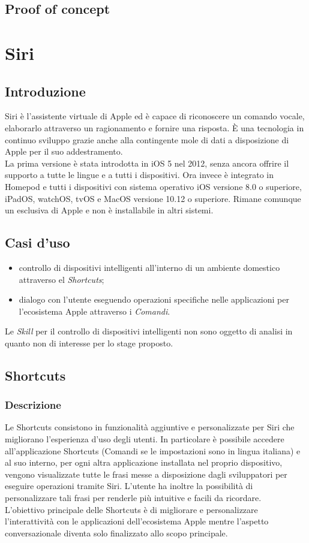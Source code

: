 	\subsection{Proof of concept}

\section{Siri}
	\subsection{Introduzione}
	Siri è l'assistente virtuale di Apple ed è capace di riconoscere un comando vocale, elaborarlo attraverso un ragionamento e fornire una risposta. È una tecnologia in continuo sviluppo grazie anche alla contingente mole di dati a disposizione di Apple per il suo addestramento. \\
	La prima versione è stata introdotta in iOS 5 nel 2012, senza ancora offrire il supporto a tutte le lingue e a tutti i dispositivi. Ora invece è integrato in Homepod e tutti i dispositivi con sistema operativo iOS versione 8.0 o superiore, iPadOS, watchOS, tvOS e MacOS versione 10.12 o superiore. Rimane comunque un esclusiva di Apple e non è installabile in altri sistemi.
	\subsection{Casi d'uso}
	\begin{itemize}
		\item controllo di dispositivi intelligenti all'interno di un ambiente domestico attraverso el \textit{Shortcuts};
		\item dialogo con l'utente eseguendo operazioni specifiche nelle applicazioni per l'ecosistema Apple attraverso i \textit{Comandi}.
	\end{itemize}
	Le \textit{Skill} per il controllo di dispositivi intelligenti non sono oggetto di analisi in quanto non di interesse per lo stage proposto.
	\subsection{Shortcuts}
		\subsubsection{Descrizione}
		Le Shortcuts consistono in funzionalità aggiuntive e personalizzate per Siri che migliorano l'esperienza d'uso degli utenti. In particolare è possibile accedere all'applicazione Shortcuts (Comandi se le impostazioni sono in lingua italiana) e al suo interno, per ogni altra applicazione installata nel proprio dispositivo, vengono visualizzate tutte le frasi messe a disposizione dagli sviluppatori per eseguire operazioni tramite Siri. L'utente ha inoltre la possibilità di personalizzare tali frasi per renderle più intuitive e facili da ricordare. \\
		L'obiettivo principale delle Shortcuts è di migliorare e personalizzare l'interattività con le applicazioni dell'ecosistema Apple mentre l'aspetto conversazionale diventa solo finalizzato allo scopo principale.
